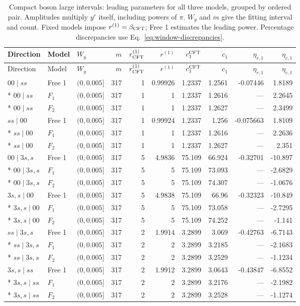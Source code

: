 \begingroup\setlength{\tabcolsep}{2pt}
\begin{longtable}{lllrrrrrrr}
\caption{Compact boson large intervals: leading parameters for all three models, grouped by ordered pair. Amplitudes multiply $y^r$ itself, including powers of $\pi$. $W_y$ and $m$ give the fitting interval and count. Fixed models impose $r^{(1)}=\beta_{\rm CFT}$; Free 1 estimates the leading power. Percentage discrepancies use Eq.~\eqref{eq:window-discrepancies}.}
\label{tab:window-large_boson-leading}\\\toprule
Direction & Model & $W_y$ & $m$ & $r^{(1)}_{\rm CFT}$ & $r^{(1)}$ & $c_1^{\rm CFT}$ & $c_1$ & $\eta_{r,1}$ & $\eta_{c,1}$\\\midrule
\endfirsthead
\toprule
Direction & Model & $W_y$ & $m$ & $r^{(1)}_{\rm CFT}$ & $r^{(1)}$ & $c_1^{\rm CFT}$ & $c_1$ & $\eta_{r,1}$ & $\eta_{c,1}$\\\midrule
\endhead
\bottomrule\endfoot
$00\mid ss$ & Free 1 & $(0,0.005]$ & 317 & 1 & 0.99926 & 1.2337 & 1.2561 & -0.07446 & 1.8189\\*
$00\mid ss$ & $F_1$ & $(0,0.005]$ & 317 & 1 & 1 & 1.2337 & 1.2616 & --- & 2.2645\\*
$00\mid ss$ & $F_2$ & $(0,0.005]$ & 317 & 1 & 1 & 1.2337 & 1.2627 & --- & 2.3499\\
\midrule
$ss\mid 00$ & Free 1 & $(0,0.005]$ & 317 & 1 & 0.99924 & 1.2337 & 1.256 & -0.075663 & 1.8109\\*
$ss\mid 00$ & $F_1$ & $(0,0.005]$ & 317 & 1 & 1 & 1.2337 & 1.2616 & --- & 2.2636\\*
$ss\mid 00$ & $F_2$ & $(0,0.005]$ & 317 & 1 & 1 & 1.2337 & 1.2627 & --- & 2.351\\
\midrule
$00\mid 3s,s$ & Free 1 & $(0,0.005]$ & 317 & 5 & 4.9836 & 75.109 & 66.924 & -0.32701 & -10.897\\*
$00\mid 3s,s$ & $F_1$ & $(0,0.005]$ & 317 & 5 & 5 & 75.109 & 73.093 & --- & -2.6829\\*
$00\mid 3s,s$ & $F_2$ & $(0,0.005]$ & 317 & 5 & 5 & 75.109 & 74.307 & --- & -1.0676\\
\midrule
$3s,s\mid 00$ & Free 1 & $(0,0.005]$ & 317 & 5 & 4.9838 & 75.109 & 66.96 & -0.32323 & -10.849\\*
$3s,s\mid 00$ & $F_1$ & $(0,0.005]$ & 317 & 5 & 5 & 75.109 & 73.058 & --- & -2.7295\\*
$3s,s\mid 00$ & $F_2$ & $(0,0.005]$ & 317 & 5 & 5 & 75.109 & 74.252 & --- & -1.141\\
\midrule
$ss\mid 3s,s$ & Free 1 & $(0,0.005]$ & 317 & 2 & 1.9914 & 3.2899 & 3.069 & -0.42763 & -6.7143\\*
$ss\mid 3s,s$ & $F_1$ & $(0,0.005]$ & 317 & 2 & 2 & 3.2899 & 3.2185 & --- & -2.1683\\*
$ss\mid 3s,s$ & $F_2$ & $(0,0.005]$ & 317 & 2 & 2 & 3.2899 & 3.2529 & --- & -1.1234\\
\midrule
$3s,s\mid ss$ & Free 1 & $(0,0.005]$ & 317 & 2 & 1.9912 & 3.2899 & 3.0643 & -0.43847 & -6.8552\\*
$3s,s\mid ss$ & $F_1$ & $(0,0.005]$ & 317 & 2 & 2 & 3.2899 & 3.2176 & --- & -2.1982\\*
$3s,s\mid ss$ & $F_2$ & $(0,0.005]$ & 317 & 2 & 2 & 3.2899 & 3.2528 & --- & -1.1274\\
\end{longtable}
\endgroup
